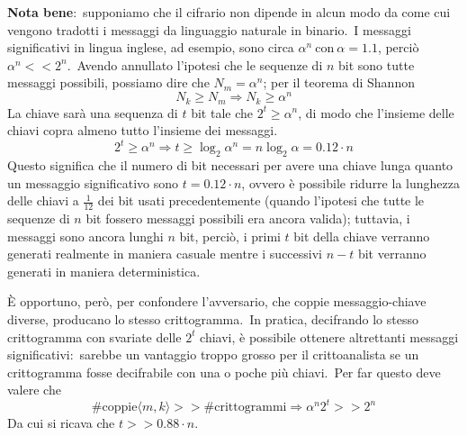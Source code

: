 \noindent\textbf{Nota bene}:\ supponiamo che il cifrario non dipende in alcun modo da come cui vengono tradotti i messaggi da linguaggio naturale in binario.\
I messaggi significativi in lingua inglese, ad esempio, sono circa $\alpha^n\ \mathrm{con}\ \alpha = 1.1$, perciò $\alpha^n << 2^n$.\
Avendo annullato l'ipotesi che le sequenze di $n$ bit sono tutte messaggi possibili, possiamo dire che $N_m = \alpha^n$; per il teorema di Shannon
\[N_k \geq N_m \Rightarrow N_k \geq \alpha^n\]
La chiave sarà una sequenza di $t$ bit tale che $2^t \geq \alpha^n$, di modo che l'insieme delle chiavi copra almeno tutto l'insieme dei messaggi.
\[2^t \geq \alpha^n \Rightarrow t \geq \log_2\alpha^n = n\log_2\alpha = 0.12\cdot n\]
Questo significa che il numero di bit necessari per avere una chiave lunga quanto un messaggio significativo sono $t = 0.12 \cdot n$, ovvero è possibile ridurre la lunghezza delle chiavi a $\frac{1}{12}$ dei bit usati precedentemente (quando l'ipotesi che tutte le sequenze di $n$ bit fossero messaggi possibili era ancora valida); tuttavia, i messaggi sono ancora lunghi $n$ bit, perciò, i primi $t$ bit della chiave verranno generati realmente in maniera casuale mentre i successivi $n - t$ bit verranno generati in maniera deterministica.

È opportuno, però, per confondere l'avversario, che coppie messaggio-chiave diverse, producano lo stesso crittogramma.\
In pratica, decifrando lo stesso crittogramma con svariate delle $2^t$ chiavi, è possibile ottenere altrettanti messaggi significativi:\ sarebbe un vantaggio troppo grosso per il crittoanalista se un crittogramma fosse decifrabile con una o poche più chiavi.\
Per far questo deve valere che
\[\#\mathrm{coppie}\langle m, k\rangle >> \#\mathrm{crittogrammi} \Rightarrow \alpha^n 2^t >> 2^n\]
Da cui si ricava che $t >> 0.88 \cdot n$.\
